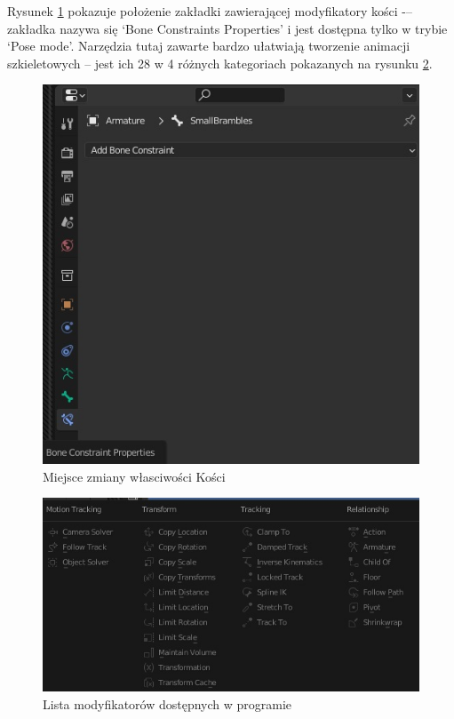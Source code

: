 \documentclass[12pt,twoside]{article}
\begin{document}
Rysunek \ref{Blender:Constraints} pokazuje położenie zakładki zawierającej
modyfikatory kości -– zakładka nazywa się `Bone Constraints Properties' i jest
dostępna tylko w trybie `Pose mode'. Narzędzia tutaj zawarte bardzo ułatwiają
tworzenie animacji szkieletowych --  jest ich 28 w 4 różnych kategoriach
pokazanych na rysunku \ref{Blender:Constraints_List}. 

\begin{figure}[hb!]
    
    \centering
    \includegraphics[width=12cm]{BlenderPict/Bone_Constraints.jpg}
    \caption{Miejsce zmiany własciwości Kości}
    \label{Blender:Constraints}
\end{figure}

\begin{figure}[hb!]
    \centering
    \includegraphics[width=12cm]{BlenderPict/Bone_Constraints_list.jpg}
    \caption{Lista modyfikatorów dostępnych w programie}
    \label{Blender:Constraints_List}
\end{figure}
\end{document}
